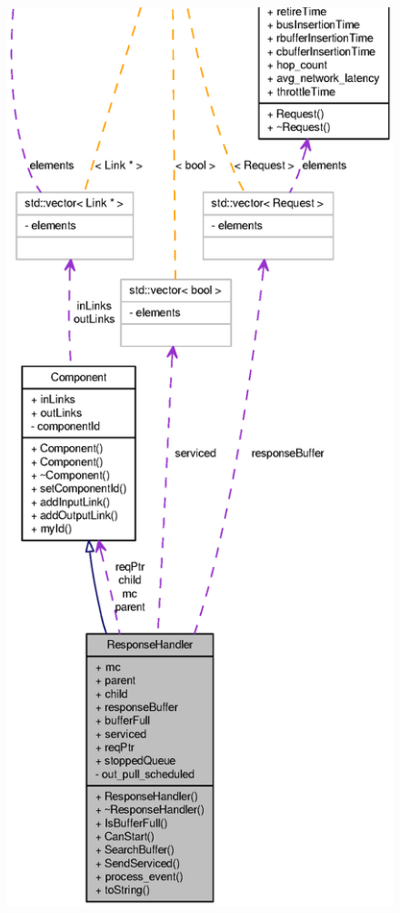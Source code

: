 \begin{figure}[H]
\begin{center}
\leavevmode
\includegraphics[width=400pt]{classResponseHandler__coll__graph}
\end{center}
\end{figure}

